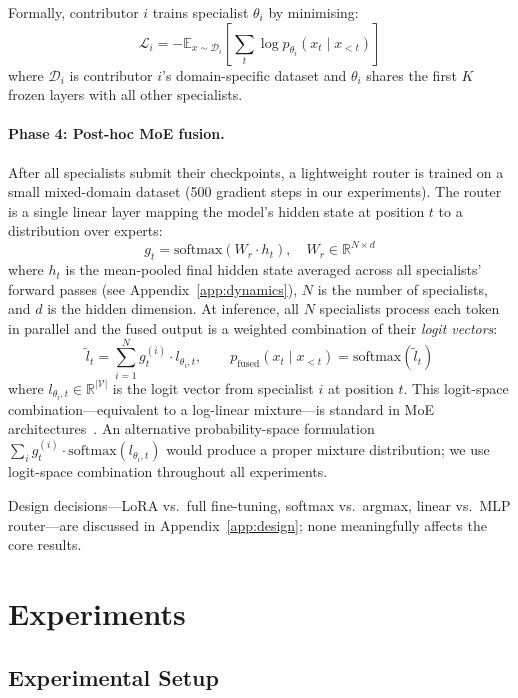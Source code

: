 \documentclass{article}
\begin{document}
Formally, contributor $i$ trains specialist $\theta_i$ by minimising:
\[
\mathcal{L}_i = -\mathbb{E}_{x \sim \mathcal{D}_i} \left[\sum_t \log p_{\theta_i}(x_t \mid x_{<t})\right]
\]
where $\mathcal{D}_i$ is contributor $i$'s domain-specific dataset and $\theta_i$ shares the first $K$ frozen layers with all other specialists.

\paragraph{Phase 4: Post-hoc MoE fusion.} After all specialists submit their checkpoints, a lightweight router is trained on a small mixed-domain dataset (500 gradient steps in our experiments). The router is a single linear layer mapping the model's hidden state at position $t$ to a distribution over experts:
\[
g_t = \mathrm{softmax}\left(W_r \cdot h_t\right), \quad W_r \in \mathbb{R}^{N \times d}
\]
where $h_t$ is the mean-pooled final hidden state averaged across all specialists' forward passes (see Appendix~\ref{app:dynamics}), $N$ is the number of specialists, and $d$ is the hidden dimension. At inference, all $N$ specialists process each token in parallel and the fused output is a weighted combination of their \emph{logit vectors}:
\[
\tilde{l}_t = \sum_{i=1}^{N} g_t^{(i)} \cdot l_{\theta_i,t}, \qquad
p_\text{fused}(x_t \mid x_{<t}) = \mathrm{softmax}\!\left(\tilde{l}_t\right)
\]
where $l_{\theta_i,t} \in \mathbb{R}^{|\mathcal{V}|}$ is the logit vector from specialist $i$ at position $t$. This logit-space combination---equivalent to a log-linear mixture---is standard in MoE architectures~\citep{shazeer2017outrageously,jiang2024mixtral}. An alternative probability-space formulation $\sum_i g_t^{(i)} \cdot \mathrm{softmax}(l_{\theta_i,t})$ would produce a proper mixture distribution; we use logit-space combination throughout all experiments.

Design decisions---LoRA vs.\ full fine-tuning, softmax vs.\ argmax, linear vs.\ MLP router---are discussed in Appendix~\ref{app:design}; none meaningfully affects the core results.

\section{Experiments}
\label{sec:experiments}

\subsection{Experimental Setup}
\label{sec:setup}
\end{document}
